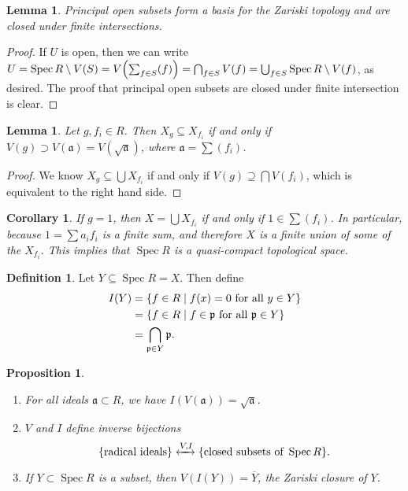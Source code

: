 \documentclass[leqno, openany]{memoir}
\newtheorem{cor}[thm]{Corollary}
\newtheorem{prop}[thm]{Proposition}
\newtheorem{lem}[thm]{Lemma}
\theoremstyle{definition}
\newtheorem{defn}[thm]{Definition}
\theoremstyle{remark}
\theoremstyle{plain}
\theoremstyle{definition}
\theoremstyle{remark}
\newcommand{\mf}[1]{\mathfrak{#1}}
\newcommand{\ol}[1]{\overline{#1}}
\DeclareMathOperator{\Spec}{Spec}
\begin{document}
\begin{lem} Principal open subsets form a basis for the Zariski topology and
are closed under finite intersections.  \end{lem}

\begin{proof} If $U$ is open, then we can write $U = \Spec R \setminus V(S) =
    V\qty(\sum_{f \in S} (f)) = \bigcap_{f \in S} V(f) = \bigcup_{f \in S}
    \Spec R \setminus V(f)$, as desired. The proof that principal open subsets
    are closed under finite intersection is clear.  \end{proof}

\begin{lem} Let $g, f_i \in R$. Then $X_g \subseteq X_{f_i}$ if and only if
$V(g) \supset V(\mf{a}) = V(\sqrt{\mf{a}})$, where $\mf{a} = \sum (f_i)$.
\end{lem}

\begin{proof} We know $X_g \subseteq \bigcup X_{f_i}$ if and only if $V(g)
\supseteq \bigcap V(f_i)$, which is equivalent to the right hand side.
\end{proof}

\begin{cor} If $g = 1$, then $X = \bigcup X_{f_i}$ if and only if $1 \in \sum
    (f_i)$. In particular, because $1 = \sum a_i f_i$ is a finite sum, and
    therefore $X$ is a finite union of some of the $X_{f_i}$. This implies that
    $\Spec R$ is a quasi-compact topological space.  \end{cor}

\begin{defn} Let $Y \subseteq \Spec R = X$. Then define \begin{align*} I(Y) &=
\qty{f \in R \mid f(x) = 0 \text{ for all }y \in Y} \\ &= \qty{f \in R \mid f
\in \mf{p}\text{ for all } \mf{p} \in Y} \\ &= \bigcap_{\mf{p} \in Y} \mf{p}.
\end{align*} \end{defn}

\begin{prop} \begin{enumerate} \item For all ideals $\mf{a} \subset R$, we have
    $I(V(\mf{a})) = \sqrt{\mf{a}}$.  \item $V$ and $I$ define inverse
    bijections \[ \qty{\text{radical ideals}} \xleftrightarrow{V,I}
    \qty{\text{closed subsets of }\Spec R}. \] \item If $Y \subset \Spec R$ is
    a subset, then $V(I(Y)) = \ol{Y}$, the Zariski closure of $Y$.
    \end{enumerate} \end{prop}
\end{document}
